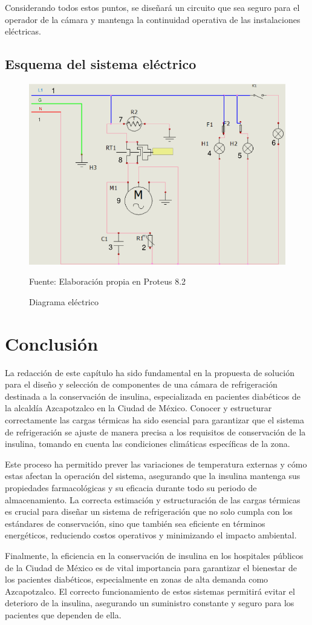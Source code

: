  Considerando todos estos puntos, se diseñará un circuito que sea seguro para el operador de la cámara y mantenga la continuidad operativa de las instalaciones eléctricas.  
 

 
\subsection{Esquema del sistema eléctrico}
\begin{figure}[H]
	\centering
	\includegraphics[width=0.7\linewidth]{figures/4-diag-electrico}
	\caption{Diagrama eléctrico}
	Fuente: Elaboración propia en Proteus 8.2
	\label{fig:4-diag-electrico}	
\end{figure}

 \newpage

\section{Conclusión}


La redacción de este capítulo ha sido fundamental en la propuesta de solución para el diseño y selección de componentes de una cámara de refrigeración destinada a la conservación de insulina, especializada en pacientes diabéticos de la alcaldía Azcapotzalco en la Ciudad de México. Conocer y estructurar correctamente las cargas térmicas ha sido esencial para garantizar que el sistema de refrigeración se ajuste de manera precisa a los requisitos de conservación de la insulina, tomando en cuenta las condiciones climáticas específicas de la zona. 

Este proceso ha permitido prever las variaciones de temperatura externas y cómo estas afectan la operación del sistema, asegurando que la insulina mantenga sus propiedades farmacológicas y su eficacia durante todo su periodo de almacenamiento. La correcta estimación y estructuración de las cargas térmicas es crucial para diseñar un sistema de refrigeración que no solo cumpla con los estándares de conservación, sino que también sea eficiente en términos energéticos, reduciendo costos operativos y minimizando el impacto ambiental.

Finalmente, la eficiencia en la conservación de insulina en los hospitales públicos de la Ciudad de México es de vital importancia para garantizar el bienestar de los pacientes diabéticos, especialmente en zonas de alta demanda como Azcapotzalco. El correcto funcionamiento de estos sistemas permitirá evitar el deterioro de la insulina, asegurando un suministro constante y seguro para los pacientes que dependen de ella.



